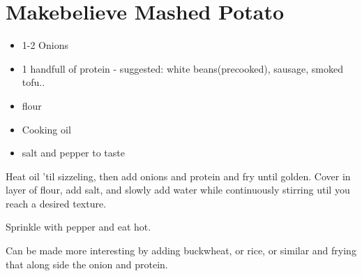 \section{Makebelieve Mashed Potato}{

  \begin{itemize}
    \item 1-2 Onions
    \item 1 handfull of protein - suggested: white beans(precooked),
      sausage, smoked tofu..
    \item flour
    \item Cooking oil
    \item salt and pepper to taste
  \end{itemize}
  \vspace{.25in}

  Heat oil 'til sizzeling, then add onions and protein and fry until golden.
  Cover in layer of flour, add salt, and slowly add water while
  continuously stirring util
  you reach a desired texture.

  Sprinkle with pepper and eat hot.

  Can be made more interesting by adding buckwheat, or rice, or
  similar and frying
  that along side the onion and protein.
}
